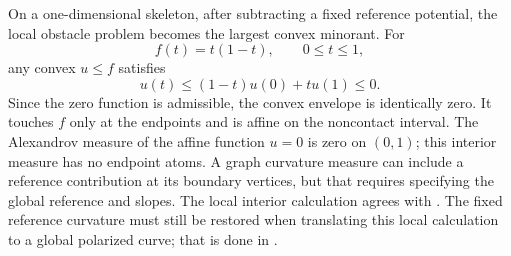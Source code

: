 \begin{example}
\label{ex:ch23-convex-interval}
On a one-dimensional skeleton, after subtracting a fixed reference
potential, the local obstacle problem becomes the largest convex minorant.
For
\begin{equation}\label{eq:ch23-concave-obstacle}
                         f(t)=t(1-t),
                         \qquad 0\leq t\leq1,
\end{equation}
any convex $u\leq f$ satisfies
\[
                  u(t)\leq(1-t)u(0)+tu(1)\leq0 .
\]
Since the zero function is admissible, the convex envelope is identically
zero.  It touches $f$ only at the endpoints and is affine on the
noncontact interval.  The Alexandrov measure of the affine function $u=0$ is zero on
$(0,1)$; this interior measure has no endpoint atoms.  A graph
curvature measure can include a reference contribution at its boundary
vertices, but that requires specifying the global reference and slopes.
The local interior calculation agrees with
.  The fixed
reference curvature must still be restored when translating this local
calculation to a global polarized curve; that is done in
.
\end{example}

